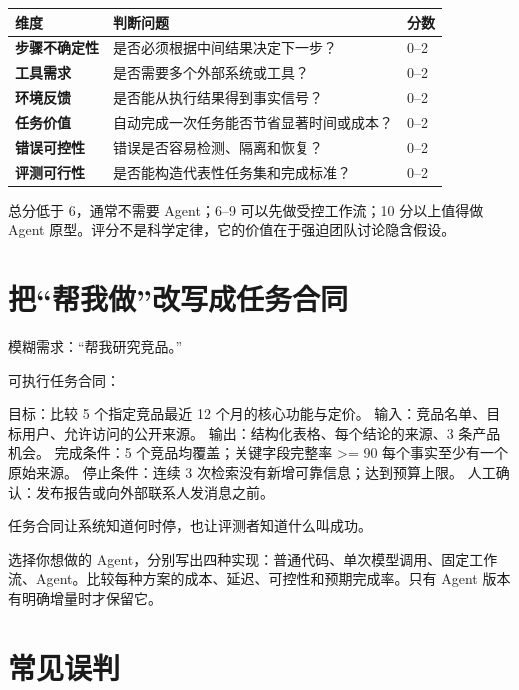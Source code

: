 \begin{table}[htbp]
\centering
\begin{tabularx}{\textwidth}{>{\bfseries}p{} X p{}}
\toprule
维度 & 判断问题 & 分数 \\
\midrule
步骤不确定性 & 是否必须根据中间结果决定下一步？ & 0--2 \\
工具需求 & 是否需要多个外部系统或工具？ & 0--2 \\
环境反馈 & 是否能从执行结果得到事实信号？ & 0--2 \\
任务价值 & 自动完成一次任务能否节省显著时间或成本？ & 0--2 \\
错误可控性 & 错误是否容易检测、隔离和恢复？ & 0--2 \\
评测可行性 & 是否能构造代表性任务集和完成标准？ & 0--2 \\
\bottomrule
\end{tabularx}
\end{table}

总分低于 6，通常不需要 Agent；6--9 可以先做受控工作流；10 分以上值得做 Agent 原型。评分不是科学定律，它的价值在于强迫团队讨论隐含假设。

\section{把“帮我做”改写成任务合同}

模糊需求：“帮我研究竞品。”

可执行任务合同：

\begin{codeblock}
目标：比较 5 个指定竞品最近 12 个月的核心功能与定价。
输入：竞品名单、目标用户、允许访问的公开来源。
输出：结构化表格、每个结论的来源、3 条产品机会。
完成条件：5 个竞品均覆盖；关键字段完整率 >= 90%
          每个事实至少有一个原始来源。
停止条件：连续 3 次检索没有新增可靠信息；达到预算上限。
人工确认：发布报告或向外部联系人发消息之前。
\end{codeblock}

任务合同让系统知道何时停，也让评测者知道什么叫成功。

\begin{practice}[为一个场景做技术降级]
选择你想做的 Agent，分别写出四种实现：普通代码、单次模型调用、固定工作流、Agent。比较每种方案的成本、延迟、可控性和预期完成率。只有 Agent 版本有明确增量时才保留它。
\end{practice}

\section{常见误判}

